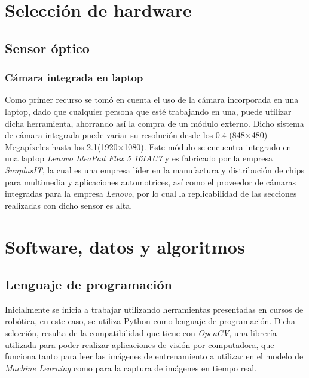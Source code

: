 \chapter{Selección de hardware}

\section{Sensor óptico}

\subsection{Cámara integrada en laptop}

Como primer recurso se tomó en cuenta el uso de la cámara incorporada en una laptop, dado que cualquier persona que esté trabajando en una, puede utilizar dicha herramienta, ahorrando así la compra de un módulo externo. Dicho sistema de cámara integrada puede variar su resolución desde los 0.4 (848$\times$480) Megapíxeles hasta los 2.1(1920$\times$1080). Este módulo se encuentra integrado en una laptop \textit{Lenovo IdeaPad Flex 5 16IAU7} y es fabricado por la empresa \textit{SunplusIT}, la cual es una empresa líder en la manufactura y distribución de chips para multimedia y aplicaciones automotrices, así como el proveedor de cámaras integradas para la empresa \textit{Lenovo}, por lo cual la replicabilidad de las secciones realizadas con dicho sensor es alta.


\chapter{Software, datos y algoritmos}

\section{Lenguaje de programación}
Inicialmente se inicia a trabajar utilizando herramientas presentadas en cursos de robótica, en este caso, se utiliza Python como lenguaje de programación. Dicha selección, resulta de la compatibilidad que tiene con \textit{OpenCV}, una librería utilizada para poder realizar aplicaciones de visión por computadora, que funciona tanto para leer las imágenes de entrenamiento a utilizar en el modelo de \textit{Machine Learning} como para la captura de imágenes en tiempo real. 

